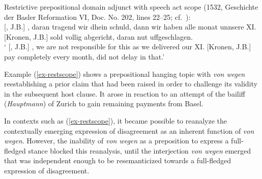 \documentclass[output=paper
  ,nobabel
  ,draftmode
  ,babelshorthands
  ,colorlinks, citecolor=brown
]{langscibook}
\begin{document}
\eanoraggedright\label{ex-restscope} Restrictive prepositional domain adjunct with speech act scope (1532, Geschichte der Basler Reformation VI, Doc. No. 202, lines 22--25; cf.\ \citealp[161]{Roth1950}):\\
 [, J.B.] , daran tragend wir dhein schuld, dann wir haben alle monat unnsere XI. [Kronen, J.B.] sold vollig abgericht, daran nut uffgeschlagen.\\
` [, J.B.] , we are not responsible for this as we delivered our XI. [Kronen, J.B.] pay completely every month, did not delay in that.'
\z

\noindent
Example (\ref{ex-restscope}) shows a prepositional hanging topic with \emph{von wegen} reestablishing a prior claim that had been raised in order to challenge its validity in the subsequent host clause. It arose in reaction to an attempt of the bailiff (\emph{Hauptmann}) of Zurich to gain remaining payments from Basel.

In contexts such as (\ref{ex-restscope}), it became possible to reanalyze the contextually emerging expression of disagreement as an inherent function of \emph{von wegen}. However, the inability of \emph{von wegen} as a preposition to express a full-fledged stance blocked this reanalysis, until the interjection \emph{von wegen} emerged that was independent enough to be resemanticized towards a full-fledged expression of disagreement.
\end{document}
